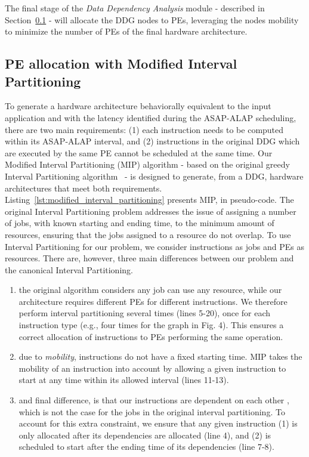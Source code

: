 The final stage of the \textit{Data Dependency Analysis} module - described in Section~\ref{ssec:modified_interval_partitioning} - will allocate the DDG nodes to PEs, leveraging the nodes mobility to minimize the number of PEs of the final hardware architecture.

\vspace{-2mm}
\subsection{PE allocation with Modified Interval Partitioning}
\label{ssec:modified_interval_partitioning}
\vspace{-1mm}
To generate a hardware architecture behaviorally equivalent to the input application and with the latency identified during the ASAP-ALAP scheduling, there are two main requirements: (1) each instruction needs to be computed within its ASAP-ALAP interval, and (2) instructions in the original DDG which are executed by the same PE cannot be scheduled at the same time.
Our Modified Interval Partitioning (MIP) algorithm - based on the original greedy Interval Partitioning algorithm~\cite{greedyIntervalPartitioning} - is designed to generate, from a DDG, hardware architectures that meet both requirements. Listing~\ref{lst:modified_interval_partitioning} presents MIP, in pseudo-code. The original Interval Partitioning problem addresses the issue of assigning a number of jobs, with known starting and ending time, to the minimum amount of resources, ensuring that the jobs assigned to a resource do not overlap. To use Interval Partitioning for our problem, we consider instructions as jobs and PEs as resources. There are, however, three main differences between our problem and the canonical Interval Partitioning.
\begin{enumerate}
\item the original algorithm considers any job can use any resource, while our architecture requires different PEs for different instructions. We therefore perform interval partitioning several times (lines 5-20), once for each instruction type (e.g., four times for the graph in Fig. 4). This ensures a correct allocation of instructions to PEs performing the same operation.
\item due to \textit{mobility}, instructions do not have a fixed starting time. MIP takes the mobility of an instruction into account by allowing a given instruction to start at any time within its allowed interval (lines 11-13).
\item and final difference, is that our instructions are dependent on each other , which is not the case for the jobs in the original interval partitioning. To account for this extra constraint, we ensure that any given instruction (1) is only allocated after its dependencies are allocated (line 4), and (2) is scheduled to start after the ending time of its dependencies (line 7-8).
\end{enumerate}

